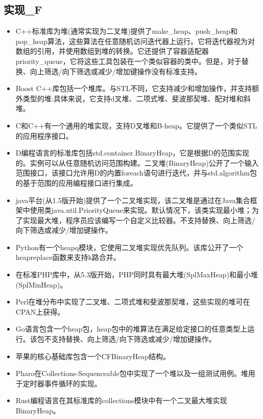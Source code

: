 \subsection{实现_F}
\begin{itemize}
\item C++标准库为堆(通常实现为二叉堆)提供了make_heap、push_heap和pop_heap算法，这些算法在任意随机访问迭代器上运行。它将迭代器视为对数组的引用，并使用数组到堆的转换。它还提供了容器适配器priority_queue，它将这些工具包装在一个类似容器的类中。但是，对于替换、向上筛选/向下筛选或减少/增加键操作没有标准支持。
\item Boost C++库包括一个堆库。与STL不同，它支持减少和增加操作，并支持额外类型的堆:具体来说，它支持d叉堆、二项式堆、斐波那契堆、配对堆和斜堆。
\item C和C++有一个通用的堆实现，支持D叉堆和B-heap。它提供了一个类似STL的应用程序接口。
\item D编程语言的标准库包括std.container.BinaryHeap，它是根据D的范围实现的。实例可以从任意随机访问范围构建。二叉堆(BinaryHeap)公开了一个输入范围接口，该接口允许用D的内置foreach语句进行迭代，并与std.algorithm包的基于范围的应用编程接口进行集成。
\item java平台(从1.5版开始)提供了一个二叉堆实现，该二叉堆是通过在Java集合框架中使用类java.util.PriorityQueue来实现。默认情况下，该类实现最小堆；为了实现最大堆，程序员应该编写一个自定义比较器。不支持替换、向上筛选/向下筛选或减少/增加键操作。
\item Python有一个heapq模块，它使用二叉堆实现优先队列。该库公开了一个heapreplace函数来支持k路合并。
\item 在标准PHP库中，从5.3版开始，PHP同时具有最大堆(SplMaxHeap)和最小堆(SplMinHeap)。
\item Perl在堆分布中实现了二叉堆、二项式堆和斐波那契堆，这些实现的堆可在CPAN上获得。
\item Go语言包含一个heap包，heap包中的堆算法在满足给定接口的任意类型上运行。该包不支持替换、向上筛选/向下筛选或减少/增加键操作。
\item 苹果的核心基础库包含一个CFBinaryHeap结构。
\item Pharo在Collections-Sequenceable包中实现了一个堆以及一组测试用例。堆用于定时器事件循环的实现。
\item Rust编程语言在其标准库的collections模块中有一个二叉最大堆实现BinaryHeap。
\end{itemize}
